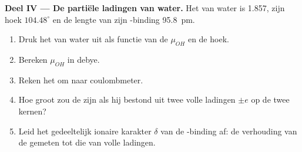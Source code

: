 \begin{problem}
\medskip
\noindent\textbf{Deel IV --- De partiële ladingen van water.}
Het  van water is \qty{1.857}{\debye}, zijn hoek
$104.48^\circ$ en de lengte van zijn -binding \qty{95.8}{pm}.
\begin{enumerate}[resume]
  \item Druk het  van water uit als functie van de
         $\mu_{OH}$ en de hoek.
  \item Bereken $\mu_{OH}$ in debye.
  \item Reken het om naar coulombmeter.
  \item Hoe groot zou de  zijn als hij bestond uit twee
        volle ladingen $\pm e$ op de twee kernen?
  \item Leid het gedeeltelijk ionaire karakter $\delta$ van de
        -binding af: de verhouding van de gemeten 
        tot die van volle ladingen.
\end{enumerate}
\end{problem}
